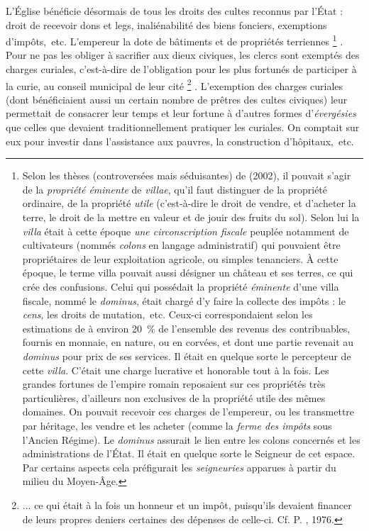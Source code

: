  L'Église bénéficie désormais de tous les droits des cultes reconnus par l'État : droit de recevoir dons et legs, inaliénabilité des biens fonciers, exemptions d'impôts,~etc. L'empereur la dote de bâtiments et de propriétés terriennes%
\footnote{Selon les thèses (controversées mais séduisantes) de  (2002), il pouvait s'agir de la \emph{propriété éminente} de \emph{villae}, qu'il faut distinguer de la propriété ordinaire, de la propriété \emph{utile} (c'est-à-dire le droit de vendre, et d'acheter la terre, le droit de la mettre en valeur et de jouir des fruits du sol). Selon lui la \emph{villa} était à cette époque \emph{une circonscription fiscale} peuplée notamment de cultivateurs (nommés \emph{colons} en langage administratif) qui pouvaient être propriétaires de leur exploitation agricole, ou simples tenanciers. À cette époque, le terme villa pouvait aussi désigner un château et ses terres, ce qui crée des confusions. Celui qui possédait la propriété \emph{éminente} d'une villa fiscale, nommé le \emph{dominus}, était chargé d'y faire la collecte des impôts : le \emph{cens}, les droits de mutation,~etc. Ceux-ci correspondaient selon les estimations de  à environ 20~\% de l'ensemble des revenus des contribuables, fournis en monnaie, en nature, ou en corvées, et dont une partie revenait au \emph{dominus} pour prix de ses services. Il était en quelque sorte le percepteur de cette \emph{villa}. C'était une charge lucrative et honorable tout à la fois. Les grandes fortunes de l'empire romain reposaient sur ces propriétés très particulières, d'ailleurs non exclusives de la propriété utile des mêmes domaines. On pouvait recevoir ces charges de l'empereur, ou les transmettre par héritage, les vendre et les acheter (comme la \emph{ferme des impôts} sous l'Ancien Régime). Le \emph{dominus} assurait le lien entre les colons concernés et les administrations de l'État. Il était en quelque sorte le Seigneur de cet espace. Par certains aspects cela préfigurait les \emph{seigneuries} apparues à partir du milieu du Moyen-Âge.}%
. Pour ne pas les obliger à sacrifier aux dieux civiques, les clercs sont exemptés des charges curiales, c'est-à-dire de l'obligation pour les plus fortunés de participer à la curie, au conseil municipal de leur cité%
\footnote{... ce qui était à la fois un honneur et un impôt, puisqu'ils devaient financer de leurs propres deniers certaines des dépenses de celle-ci. Cf. P. , 1976.} 
. L'exemption des charges curiales (dont bénéficiaient aussi un certain nombre de prêtres des cultes civiques) leur permettait de consacrer leur temps et leur fortune à d'autres formes d'\emph{évergésies} que celles que devaient traditionnellement pratiquer les curiales. On comptait sur eux pour investir dans l'assistance aux pauvres, la construction d'hôpitaux,~etc. 

